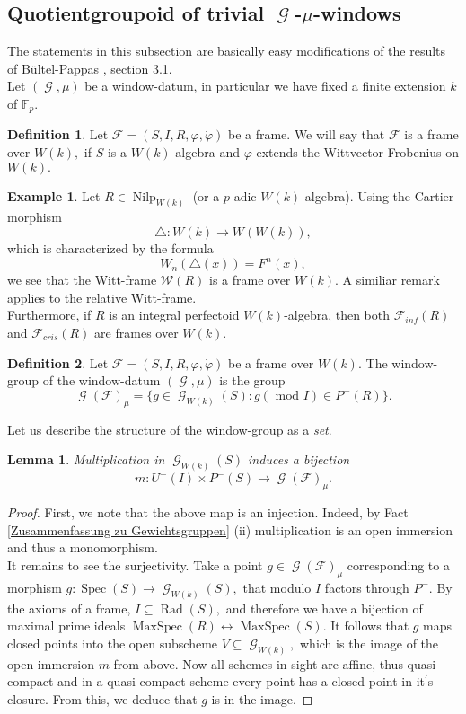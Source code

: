 \documentclass[a4paper,10,5 pt]{amsart}
\newtheorem{Lemma}[Satz]{Lemma}
\theoremstyle{definition}
\newtheorem{Definition}{Definition}
\newtheorem{Example}[Satz]{Example}
\DeclareMathOperator{\Spec}{Spec}
\DeclareMathOperator{\Nilp}{Nilp}
\DeclareMathOperator{\Rad}{Rad}
\DeclareMathOperator{\MaxSpec}{MaxSpec}
\DeclareMathOperator{\G}{\mathcal{G}}
\begin{document}
\subsection{Quotientgroupoid of trivial $\G$-$\mu$-windows}
The statements in this subsection are basically easy modifications of the results of Bültel-Pappas \cite{BP}, section 3.1.
\\
Let $(\G,\mu)$ be a window-datum, in particular we have fixed a finite extension $k$ of $\mathbb{F}_{p}.$
\begin{Definition}
Let $\mathcal{F}=(S,I,R,\varphi,\dot{\varphi})$ be a frame. We will say that $\mathcal{F}$ is a frame over $W(k),$ if $S$ is a $W(k)$-algebra and $\varphi$ extends the Wittvector-Frobenius on $W(k).$
\end{Definition}
\begin{Example}
Let $R\in \Nilp_{W(k)}$ (or a $p$-adic $W(k)$-algebra). Using the Cartier-morphism
$$\bigtriangleup\colon W(k)\rightarrow W(W(k)),$$
which is characterized by the formula
$$
W_{n}(\bigtriangleup(x))=F^{n}(x),
$$
we see that the Witt-frame $\mathcal{W}(R)$ is a frame over $W(k).$ A similiar remark applies to the relative Witt-frame.
\\
Furthermore, if $R$ is an integral perfectoid $W(k)$-algebra, then both $\mathcal{F}_{inf}(R)$ and $\mathcal{F}_{cris}(R)$ are frames over $W(k).$
\end{Example}
\begin{Definition}
Let $\mathcal{F}=(S,I,R,\varphi,\dot{\varphi})$ be a frame over $W(k).$ The window-group of the window-datum $(\G,\mu)$ is the group
$$\G(\mathcal{F})_{\mu}=\lbrace g\in \G_{W(k)}(S)\colon g (\text{ mod }I)\in P^{-}(R) \rbrace.$$
\end{Definition}
Let us describe the structure of the window-group as a \textit{set}.
\begin{Lemma}\label{Zerlegungslemma fuer die Window-gruppe}
Multiplication in $\G_{W(k)}(S)$ induces a bijection
$$m\colon U^{+}(I) \times P^{-}(S) \rightarrow \G(\mathcal{F})_{\mu}.$$
\end{Lemma}
\begin{proof}
First, we note that the above map is an injection. Indeed, by Fact \ref{Zusammenfassung zu Gewichtsgruppen} (ii) multiplication is an open immersion and thus a monomorphism.
\\
It remains to see the surjectivity. Take a point $g\in \G(\mathcal{F})_{\mu}$ corresponding to a morphism $g\colon \Spec(S) \rightarrow \G_{W(k)}(S),$ that modulo $I$ factors through $P^{-}.$ By the axioms of a frame, $I\subseteq \Rad(S),$ and therefore we have a bijection of maximal prime ideals $\MaxSpec(R) \longleftrightarrow \MaxSpec(S).$ It follows that $g$ maps closed points into the open subscheme $V\subseteq \G_{W(k)},$ which is the image of the open immersion $m$ from above. Now all schemes in sight are affine, thus quasi-compact and in a quasi-compact scheme every point has a closed point in it$^{\prime}$s closure. From this, we deduce that $g$ is in the image.
\end{proof}
\end{document}
